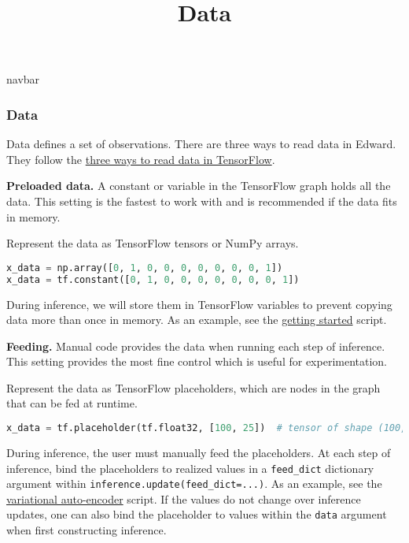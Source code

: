 \title{Data}

{{navbar}}

\subsubsection{Data}

Data defines a set of observations. There are three ways
to read data in Edward. They follow the
\href{https://www.tensorflow.org/versions/master/how_tos/reading_data/index.html}
{three ways to read data in TensorFlow}.

\textbf{Preloaded data.}
A constant or variable in the TensorFlow graph holds all the data.
This setting is the fastest to work with and is recommended if the
data fits in memory.

Represent the data as TensorFlow tensors or NumPy arrays.

\begin{lstlisting}[language=Python]
x_data = np.array([0, 1, 0, 0, 0, 0, 0, 0, 0, 1])
x_data = tf.constant([0, 1, 0, 0, 0, 0, 0, 0, 0, 1])
\end{lstlisting}

During inference, we will store them in TensorFlow variables to
prevent copying data more than once in memory. As an example, see the
\href{https://github.com/blei-lab/edward/blob/master/examples/getting_started_example.py}
{getting started} script.

\textbf{Feeding.}
Manual code provides the data when running each step of inference.
This setting provides the most fine control which is useful for
experimentation.

Represent the data as TensorFlow placeholders, which are nodes in the
graph that can be fed at runtime.

\begin{lstlisting}[language=Python]
x_data = tf.placeholder(tf.float32, [100, 25])  # tensor of shape (100, 25)
\end{lstlisting}

During inference, the user must manually feed the placeholders. At each
step of inference, bind the placeholders to realized values in a
\texttt{feed_dict} dictionary argument within
\texttt{inference.update(feed_dict={...})}. As an example, see the
\href{https://github.com/blei-lab/edward/blob/master/examples/vae.py}
{variational auto-encoder} script.
If the values do not change over inference updates, one can also bind
the placeholder to values within the \texttt{data} argument when
first constructing inference.

